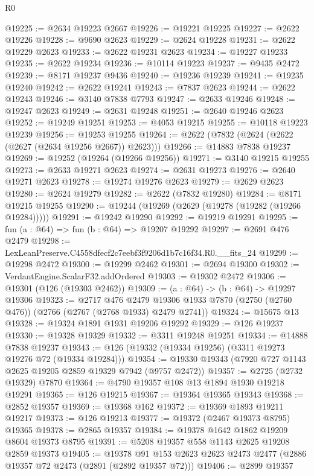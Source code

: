\begin{lexlean}{R0}
\begin{coremodule}
@19225 := @2634 @19223 @2667
@19226 := @19221 @19225
@19227 := @2622 @19226
@19228 := @9690 @2623
@19229 := @2624 @19228
@19231 := @2622 @19229 @2623
@19233 := @2622 @19231 @2623
@19234 := @19227 @19233
@19235 := @2622 @19234
@19236 := @10114 @19223
@19237 := @9435 @2472
@19239 := @8171 @19237 @9436
@19240 := @19236 @19239
@19241 := @19235 @19240
@19242 := @2622 @19241
@19243 := @7837 @2623
@19244 := @2622 @19243
@19246 := @3140 @7838 @7793
@19247 := @2633 @19246
@19248 := @19247 @2623
@19249 := @2631 @19248
@19251 := @2640 @19246 @2623
@19252 := @19249 @19251
@19253 := @4053 @19215
@19255 := @10118 @19223 @19239
@19256 := @19253 @19255
@19264 := @2622 (@7832 (@2624 (@2622 (@2627 (@2634 @19256 @2667)) @2623)))
@19266 := @14883 @7838 @19237
@19269 := @19252 (@19264 (@19266 @19256))
@19271 := @3140 @19215 @19255
@19273 := @2633 @19271 @2623
@19274 := @2631 @19273
@19276 := @2640 @19271 @2623
@19278 := @19274 @19276 @2623
@19279 := @2629 @2623
@19280 := @2624 @19279
@19282 := @2622 (@7832 @19280)
@19284 := @8171 @19215 @19255
@19290 := @19244 (@19269 (@2629 (@19278 (@19282 (@19266 @19284)))))
@19291 := @19242 @19290
@19292 := @19219 @19291
@19295 := fun (a : @64) => fun (b : @64) => @19207 @19292
@19297 := @2691 @476 @2479
@19298 := LexLeanPreserve.C4558dfecf2c7eebf3f9206d1b7c16f34.R0.__fits_24
@19299 := @19298 @2472
@19300 := @19299 @2462
@19301 := @2694 @19300
@19302 := VerdantEngine.ScalarF32.addOrdered
@19303 := @19302 @2472
@19306 := @19301 (@126 (@19303 @2462))
@19309 := (a : @64) -> (b : @64) -> @19297 @19306
@19323 := @2717
    @476
    @2479
    @19306
    @1933
    @7870
    (@2750 (@2760 @476))
    (@2766 (@2767 (@2768 @1933) @2479 @2741))
@19324 := @15675 @13
@19328 := @19324 @1891 @1931 @19206 @19292
@19329 := @126 @19237
@19330 := @19328 @19329
@19332 := @3311 @19248 @19251
@19334 := @14888 @7838 @19237
@19343 := @126 (@19332 (@19334 @19256) (@3311 @19273 @19276 @72 (@19334 @19284)))
@19354 := @19330 @19343 (@7920 @727 @1143 @2625 @19205 @2859 @19329 @7942 (@9757 @2472))
@19357 := @2725 (@2732 @19329) @7870
@19364 := @4790 @19357 @108 @13 @1894 @1930 @19218 @19291
@19365 := @126 @19215
@19367 := @19364 @19365 @19343
@19368 := @2852 @19357
@19369 := @19368 @162
@19372 := @19369 @1893 @19211 @19217
@19373 := @126 @19213
@19377 := @19372 (@2467 @19373 @8795) @19365
@19378 := @2865 @19357
@19384 := @19378 @1642 @1862 @19209 @8604 @19373 @8795
@19391 := @5208 @19357 @558 @1143 @2625 @19208 @2859 @19373
@19405 := @19378
    @91
    @153
    @2623
    @2623
    @2473
    @2477
    (@2886 @19357 @72 @2473 (@2891 (@2892 @19357 @72)))
@19406 := @2899 @19357

\end{coremodule}
\end{lexlean}
